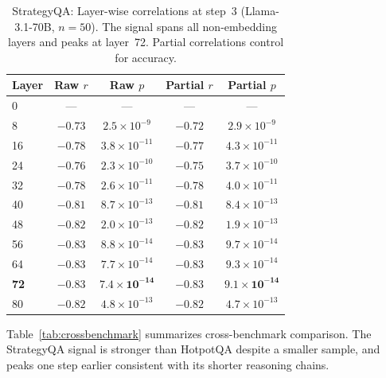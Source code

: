 \documentclass{article}
\begin{document}
\begin{table}[ht]
\caption{StrategyQA: Layer-wise correlations at step~3 (Llama-3.1-70B, $n{=}50$). The signal spans all non-embedding layers and peaks at layer~72. Partial correlations control for accuracy.}
\label{tab:strategyqa_layers}
\centering
\small
\begin{tabular}{lcccc}
\toprule
Layer & Raw $r$ & Raw $p$ & Partial $r$ & Partial $p$ \\
\midrule
0  & --- & --- & --- & --- \\
8  & $-0.73$ & $2.5 \times 10^{-9}$ & $-0.72$ & $2.9 \times 10^{-9}$ \\
16 & $-0.78$ & $3.8 \times 10^{-11}$ & $-0.77$ & $4.3 \times 10^{-11}$ \\
24 & $-0.76$ & $2.3 \times 10^{-10}$ & $-0.75$ & $3.7 \times 10^{-10}$ \\
32 & $-0.78$ & $2.6 \times 10^{-11}$ & $-0.78$ & $4.0 \times 10^{-11}$ \\
40 & $-0.81$ & $8.7 \times 10^{-13}$ & $-0.81$ & $8.4 \times 10^{-13}$ \\
48 & $-0.82$ & $2.0 \times 10^{-13}$ & $-0.82$ & $1.9 \times 10^{-13}$ \\
56 & $-0.83$ & $8.8 \times 10^{-14}$ & $-0.83$ & $9.7 \times 10^{-14}$ \\
64 & $-0.83$ & $7.7 \times 10^{-14}$ & $-0.83$ & $9.3 \times 10^{-14}$ \\
\textbf{72} & $\mathbf{-0.83}$ & $\mathbf{7.4 \times 10^{-14}}$ & $\mathbf{-0.83}$ & $\mathbf{9.1 \times 10^{-14}}$ \\
80 & $-0.82$ & $4.8 \times 10^{-13}$ & $-0.82$ & $4.7 \times 10^{-13}$ \\
\bottomrule
\end{tabular}
\end{table}

Table~\ref{tab:crossbenchmark} summarizes cross-benchmark comparison. The StrategyQA signal is stronger than HotpotQA despite a smaller sample, and peaks one step earlier consistent with its shorter reasoning chains.
\end{document}
